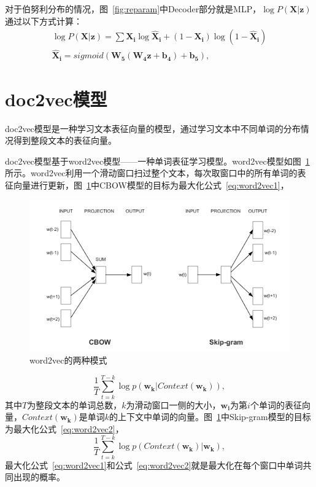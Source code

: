 对于伯努利分布的情况，图~\ref{fig:reparam}中Decoder部分就是MLP，$\log P(\bm X|\bm z)$通过以下方式计算：
\begin{equation}
  \begin{gathered}
  \label{eq:bernoulli}
\log P(\bm X|\bm z) = \sum \bm {X_i}\log\bm {\hat X_i} + (1-\bm {X_i})\log(1 - \bm {\hat X_i}) \\
\bm {\hat X_i} = sigmoid(\bm {W_5}(\bm {W_4}\bm z + \bm {b_4}) + \bm {b_5}),
  \end{gathered}
\end{equation}

\section{doc2vec模型}
doc2vec模型是一种学习文本表征向量的模型，通过学习文本中不同单词的分布情况得到整段文本的表征向量。\par
doc2vec模型基于word2vec模型——一种单词表征学习模型。word2vec模型如图~\ref{fig:word2vec}所示。word2vec利用一个滑动窗口扫过整个文本，每次取窗口中的所有单词的表征向量进行更新，图~\ref{fig:word2vec}中CBOW模型的目标为最大化公式~\ref{eq:word2vec1}，

\begin{figure}[h]
  \centering
  \includegraphics[width=1\textwidth]{word2vec.png}
  \caption{word2vec的两种模式}
  \label{fig:word2vec}
\end{figure}

\begin{equation}
  \label{eq:word2vec1}
  \frac{1}{T}\sum_{t=k}^{T-k}\log p(\bm {w_k}|Context(\bm {w_k})),
\end{equation}
其中$T$为整段文本的单词总数，$k$为滑动窗口一侧的大小，$\bm {w_i}$为第$i$个单词的表征向量，$Context(\bm {w_k})$是单词$k$的上下文中单词的向量。图~\ref{fig:word2vec}中Skip-gram模型的目标为最大化公式~\ref{eq:word2vec2}，
\begin{equation}
  \label{eq:word2vec2}
  \frac{1}{T}\sum_{t=k}^{T-k}\log p(Context(\bm {w_k})|\bm {w_k}),
\end{equation}
最大化公式~\ref{eq:word2vec1}和公式~\ref{eq:word2vec2}就是最大化在每个窗口中单词共同出现的概率。\par

